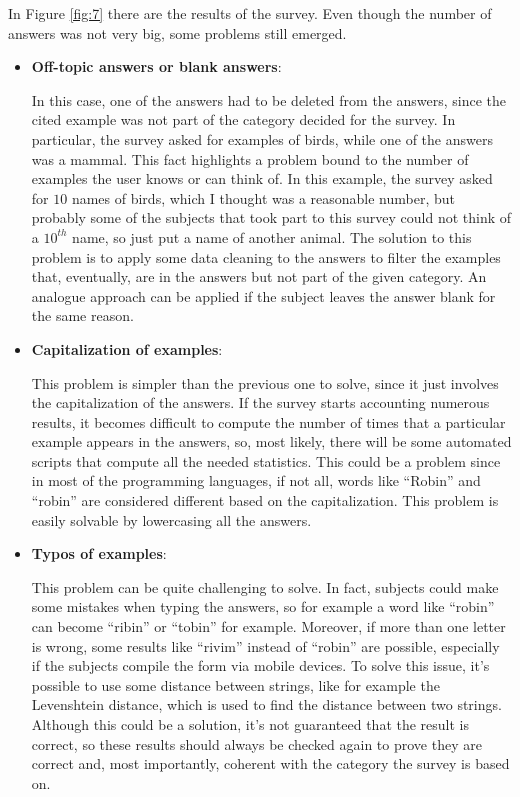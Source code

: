 \documentclass[conference]{IEEEtran}
\begin{document}
		\noindent In Figure \ref{fig:7} there are the results of the survey. Even though the number of answers was not very big, some problems still emerged.
		\begin{itemize}
		
			\item \textbf{Off-topic answers or blank answers}:
				
				In this case, one of the answers had to be deleted from the answers, since the cited example was not part of the category decided for the survey. In particular, the survey asked for examples of birds, 
				while one of the answers was a mammal. This fact highlights a problem bound to the number of examples the user knows or can think of. In this example, the survey asked for $10$ names of birds,
				which I thought was a reasonable number, but probably some of the subjects that took part to this survey could not think of a $10^{th}$ name, so just put a name of another animal. The solution 
				to this problem is to apply some data cleaning to the answers to filter the examples that, eventually, are in the answers but not part of the given category. An analogue approach can be applied if the 
				subject leaves the answer blank for the same reason.
			
			\item \textbf{Capitalization of examples}:
			
				This problem is simpler than the previous one to solve, since it just involves the capitalization of the answers. If the survey starts accounting numerous results, it becomes difficult to 
				compute the number of times that a particular example appears in the answers, so, most likely, there will be some automated scripts that compute all the needed statistics. This could be a problem since 
				in most of the programming languages, if not all, words like ``Robin'' and ``robin'' are considered different based on the capitalization. This problem is easily solvable by lowercasing all the 
				answers.
				
			\item \textbf{Typos of examples}:
				
				This problem can be quite challenging to solve. In fact, subjects could make some mistakes when typing the answers, so for example a word like ``robin'' can become ``ribin'' or ``tobin'' for example. 
				Moreover, if more than one letter is wrong, some results like ``rivim'' instead of ``robin'' are possible, especially if the subjects compile the form via mobile devices. To solve this issue, 
				it's possible to use some distance between strings, like for example the Levenshtein distance, which is used to find the distance between two strings. Although this could be a solution,
				it's not guaranteed that the result is correct, so these results should always be checked again to prove they are correct and, most importantly, coherent with the category the survey is based on.
				

\end{itemize}
\end{document}
